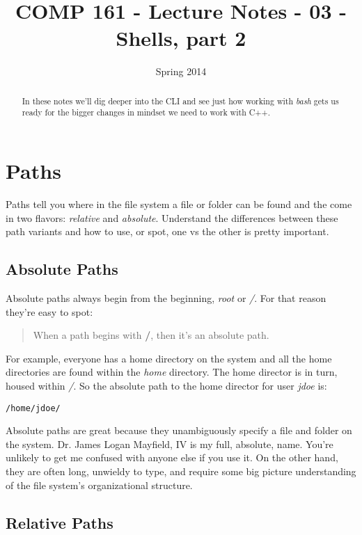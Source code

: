 \documentclass[]{tufte-handout}
\title{COMP 161 - Lecture Notes - 03 - Shells, part 2}
\date{Spring 2014}
\begin{document}
\maketitle

\begin{abstract}
In these notes we'll dig deeper into  the CLI and see just how working with \textit{bash} gets us ready for the bigger changes in mindset we need to work with C++. 
\end{abstract}

\section{Paths}

Paths tell you where in the file system a file or folder can be found and the come in two flavors: \textit{relative} and \textit{absolute}. Understand the differences between these path variants and how to use, or spot, one vs the other is pretty important.  

\subsection{Absolute Paths}

Absolute paths always begin from the beginning, \textit{root} or \textit{/}.  For that reason they're easy to spot:
\begin{quote}
When a path begins with \textbf{/}, then it's an absolute path. 
\end{quote} 
For example, everyone has a home directory on the system and all the home directories are found within the \textit{home} directory. The home director is in turn, housed within \textit{/}. So the absolute path to the home director for user \textit{jdoe} is:
\begin{verbatim}
/home/jdoe/
\end{verbatim}


Absolute paths are great because they unambiguously specify a file and folder on the system. Dr. James Logan Mayfield, IV is my full, absolute, name. You're unlikely to get me confused with anyone else if you use it. On the other hand, they are often long, unwieldy to type, and require some big picture understanding of the file system's organizational structure.  

\subsection{Relative Paths}
\end{document}
